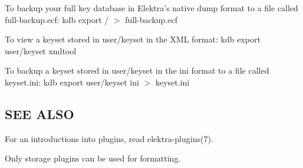 To backup your full key database in Elektra's native {\ttfamily dump} format to a file called {\ttfamily full-\/backup.\+ecf}\+: {\ttfamily kdb export / $>$ full-\/backup.\+ecf}

To view a keyset stored in {\ttfamily user/keyset} in the X\+M\+L format\+: {\ttfamily kdb export user/keyset xmltool}

To backup a keyset stored in {\ttfamily user/keyset} in the {\ttfamily ini} format to a file called {\ttfamily keyset.\+ini}\+: {\ttfamily kdb export user/keyset ini $>$ keyset.\+ini}

\subsection*{S\+E\+E A\+L\+S\+O}


\begin{DoxyItemize}
\item For an introductions into plugins, read elektra-\/plugins(7).
\item Only storage plugins can be used for formatting. 
\end{DoxyItemize}